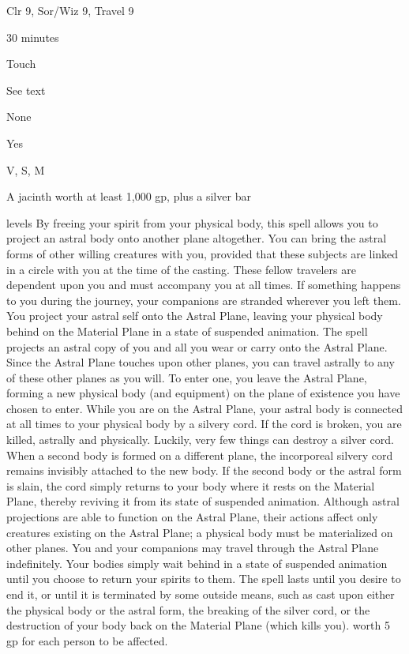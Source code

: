 
\begin{description*}
\item[Level:] Clr 9, Sor/Wiz 9, Travel 9
\item[Casting Time:] 30 minutes
\item[Range:] Touch
\item[Duration:] See text
\item[Saving Throw:] None
\item[Spell Resistance:] Yes
\item[Components:] V, S, M
\item[Arcane Material Component:] A jacinth worth at least 1,000 gp, plus a silver bar
\end{description*}

levels
By freeing your spirit from your physical body, this spell allows you to project
an astral body onto another plane altogether.
You can bring the astral forms of other willing creatures with you, provided that
these subjects are linked in a circle with you at the time of the casting. These
fellow travelers are dependent upon you and must accompany you at all times. If
something happens to you during the journey, your companions are stranded wherever
you left them.
You project your astral self onto the Astral Plane, leaving your physical body
behind on the Material Plane in a state of suspended animation. The spell projects
an astral copy of you and all you wear or carry onto the Astral Plane. Since the
Astral Plane touches upon other planes, you can travel astrally to any of these
other planes as you will. To enter one, you leave the Astral Plane, forming a new
physical body (and equipment) on the plane of existence you have chosen to enter.
While you are on the Astral Plane, your astral body is connected at all times to
your physical body by a silvery cord. If the cord is broken, you are killed, astrally
and physically. Luckily, very few things can destroy a silver cord. When a second
body is formed on a different plane, the incorporeal silvery cord remains invisibly
attached to the new body. If the second body or the astral form is slain, the cord
simply returns to your body where it rests on the Material Plane, thereby reviving
it from its state of suspended animation. Although astral projections are able
to function on the Astral Plane, their actions affect only creatures existing on
the Astral Plane; a physical body must be materialized on other planes.
You and your companions may travel through the Astral Plane indefinitely. Your
bodies simply wait behind in a state of suspended animation until you choose to
return your spirits to them. The spell lasts until you desire to end it, or until
it is terminated by some outside means, such as  cast upon
either the physical body or the astral form, the breaking of the silver cord, or
the destruction of your body back on the Material Plane (which kills you).
worth 5 gp for each person to be affected.